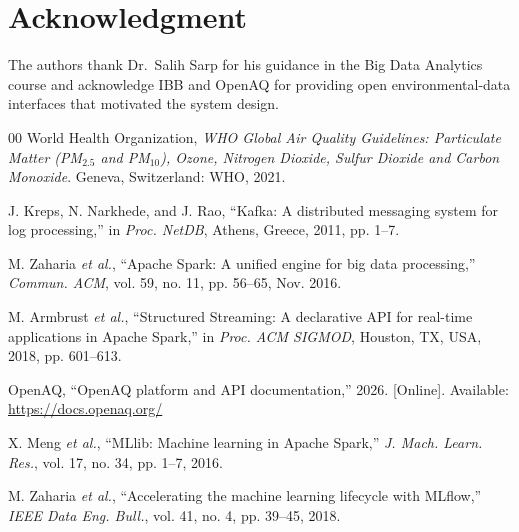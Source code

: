 \documentclass[conference]{IEEEtran}
\begin{document}
\section*{Acknowledgment}
The authors thank Dr.\ Salih Sarp for his guidance in the Big Data Analytics
course and acknowledge IBB and OpenAQ for providing open environmental-data
interfaces that motivated the system design.

\balance
\begin{thebibliography}{00}
World Health Organization, \emph{WHO Global Air Quality Guidelines:
Particulate Matter (PM$_{2.5}$ and PM$_{10}$), Ozone, Nitrogen Dioxide,
Sulfur Dioxide and Carbon Monoxide}. Geneva, Switzerland: WHO, 2021.

J. Kreps, N. Narkhede, and J. Rao, ``Kafka: A distributed messaging system
for log processing,'' in \emph{Proc. NetDB}, Athens, Greece, 2011, pp. 1--7.

M. Zaharia \emph{et al.}, ``Apache Spark: A unified engine for big data
processing,'' \emph{Commun. ACM}, vol. 59, no. 11, pp. 56--65, Nov. 2016.

M. Armbrust \emph{et al.}, ``Structured Streaming: A declarative API for
real-time applications in Apache Spark,'' in \emph{Proc. ACM SIGMOD},
Houston, TX, USA, 2018, pp. 601--613.

OpenAQ, ``OpenAQ platform and API documentation,'' 2026. [Online].
Available: \url{https://docs.openaq.org/}

X. Meng \emph{et al.}, ``MLlib: Machine learning in Apache Spark,''
\emph{J. Mach. Learn. Res.}, vol. 17, no. 34, pp. 1--7, 2016.

M. Zaharia \emph{et al.}, ``Accelerating the machine learning lifecycle with
MLflow,'' \emph{IEEE Data Eng. Bull.}, vol. 41, no. 4, pp. 39--45, 2018.
\end{thebibliography}
\end{document}
